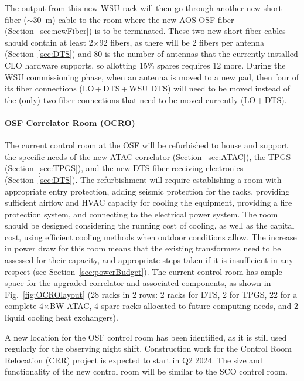 The output from this new WSU rack will then go through another new short fiber ($\sim$30~m) cable to the room where the new AOS-OSF fiber (Section~\ref{sec:newFiber}) is to be terminated.  These two new short fiber cables should contain at least 2$\times$92 fibers, as there will be 2 fibers per antenna (Section~\ref{sec:DTS}) and 80 is the number of antennas that the currently-installed CLO hardware supports, so allotting 15\% spares requires 12 more. During the WSU commissioning phase, when an antenna is moved to a new pad, then four of its fiber connections (LO\,+\,DTS\,+\,WSU DTS) will need to be moved instead of the (only) two fiber connections that need to be moved currently (LO\,+\,DTS).


\paragraph{OSF Correlator Room (OCRO)}
\label{sec:OCRO}
The current control room at the OSF will be refurbished to house and support the specific needs of the new ATAC correlator (Section~\ref{sec:ATAC}), the TPGS (Section~\ref{sec:TPGS}), and the new DTS fiber receiving electronics (Section~\ref{sec:DTS}). The refurbishment will require establishing a room with appropriate entry protection, adding seismic protection for the racks, providing sufficient airflow and HVAC capacity for cooling the equipment, providing a fire protection system, and connecting to the electrical power system. The room should be designed considering the running cost of cooling, as well as the capital cost, using efficient cooling methods when outdoor conditions allow. The increase in power draw for this room means that the existing transformers need to be assessed for their capacity, and appropriate steps taken if it is insufficient in any respect (see Section~\ref{sec:powerBudget}). The current control room has ample space for the upgraded correlator and associated components, as shown in Fig.~\ref{fig:OCROlayout}  (28 racks in 2 rows: 2 racks for DTS, 2 for TPGS, 22 for a complete 4$\times$BW ATAC, 4 spare racks allocated to future computing needs, and 2 liquid cooling heat exchangers). 

A new location for the OSF control room has been identified, as it is still used regularly for the observing night shift. Construction work for the Control Room Relocation (CRR) project is expected to start in Q2 2024. The size and functionality of the new control room will be similar to the SCO control room.


